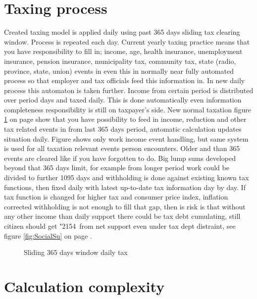 \section{Taxing process}
\label{tax_process}
Created taxing model is applied daily using past 365 days sliding tax clearing window.
Process is repeated each day.
Current yearly taxing practice means that you have responsibility to fill in;
income, age, health insurance, unemployment insurance, pension insurance,
municipality tax, community tax, state (radio, province, state, union) events
in even this in normally near fully automated process so that employer
and tax officials feed this information in.
In new daily process this automaton is taken further.
Income from certain period is distributed over period days and taxed daily.
This is done automatically even information completeness responsibility is still on taxpayer's side.
New normal taxation figure \ref{fig:taxing} on page \pageref{fig:taxing}
show that you have possibility to feed in income, reduction
and other tax related events in from last 365 days period,
automatic calculation updates situation daily.
Figure shows only work income event handling,
but same system is used for all taxation relevant events person encounters.
Older and than 365 events are cleared like if you have forgotten to do.
Big lump sums developed beyond that 365 days limit,
for example from longer period work could be divided to further 1095 days
and withholding is done against existing known tax functions,
then fixed daily with latest up-to-date tax information day by day.
If tax function is changed for higher tax and consumer price index,
inflation corrected withholding is not enough to fill that gap,
then is risk is that without any other income than daily support there could be tax debt cumulating,
still citizen should get \char"2154~from net support even under tax dept distraint,
see figure \ref{fig:SocialSu} on page \pageref{fig:SocialSu}.
\begin{figure} %
 \begin{center}
  \caption{Sliding 365 days window daily tax}
  \label{fig:taxing}
 \end{center}
\end{figure}

\section{Calculation complexity}
\label{calculation_complexity}


